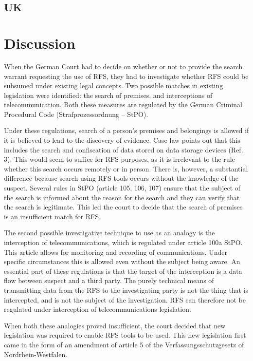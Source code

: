 \documentclass[11pt]{article} %
\begin{document}
\subsection{UK}

\section{Discussion}
When the German Court had to decide on whether or not to provide the search warrant requesting the use of RFS, they had to investigate whether RFS could be subsumed under existing legal concepts.
Two possible matches in existing legislation were identified: the search of premises, and interceptions of telecommunication.
Both these measures are regulated by the German Criminal Procedural Code (Strafprozessordnung – StPO).

Under these regulations, search of a person's premises and belongings is allowed if it is believed to lead to the discovery of evidence.
Case law points out that this includes the search and confiscation of data stored on data storage devices (Ref. 3). %
This would seem to suffice for RFS purposes, as it is irrelevant to the rule whether this search occurs remotely or in person.
There is, however, a substantial difference because search using RFS tools occurs without the knowledge of the suspect.
Several rules in StPO (article 105, 106, 107) ensure that the subject of the search is informed about the reason for the search and they can verify that the search is legitimate.
This led the court to decide that the search of premises is an insufficient match for RFS.

The second possible investigative technique to use as an analogy is the interception of telecommunications, which is regulated under article 100a StPO.
This article allows for monitoring and recording of communications.
Under specific circumstances this is allowed even without the subject being aware.
An essential part of these regulations is that the target of the interception is a data flow between suspect and a third party.
The purely technical means of transmitting data from the RFS to the investigating party is not the thing that is intercepted, and is not the subject of the investigation.
RFS can therefore not be regulated under interception of telecommunications legislation.

When both these analogies proved insufficient, the court decided that new legislation was required to enable RFS tools to be used.
This new legislation first came in the form of an amendment of article 5 of the Verfassungsschutzgesetz of Nordrhein-Westfalen.
\end{document}
